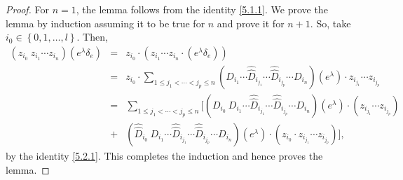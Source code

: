 \documentclass{article}
\begin{document}
\begin{proof}
For $n=1$, the lemma follows from the identity \eqref{5.1.1}. We prove the lemma by induction assuming it to be true for $n$ and prove  it for $n+1$. So, take $i_0\in \left\{0,1,\ldots, l\right\}$. Then, 
\begin{eqnarray*}
\left(z_{i_0}~z_{i_1}\cdots z_{i_n}\right) \left(e^\lambda\delta_e\right)&=&z_{i_0}\cdot \left(z_{i_1}\cdots z_{i_n}\cdot \left(e^\lambda\delta_e\right)\right)\\
&=& z_{i_0} \cdot \sum_{1\leq j_1 <\cdots< j_p\leq n}  \left( D_{i_1} \cdots \hat{\hat{D}}_{i_{j_1}}\cdots \hat{\hat{D}}_{i_{j_p}} \cdots{{D}}_{i_{n}}\right) \left(e^\lambda\right)\cdot z_{i_{j_1}}\cdots z_{i_{j_p}}\\
&=&\sum_{1\leq j_1<\cdots < j_p \leq n} [ \left( D_{i_0}~D_{i_1} \cdots \hat{\hat{D}}_{i_{j_1}}\cdots \hat{\hat{D}}_{i_{j_p}} \cdots{{D}}_{i_{n}}\right)\left(e^\lambda\right)\cdot 
 \left(z_{i_{j_1}}\cdots z_{i_{j_p}}\right) \\
 &+&\left(\hat{\hat{D}}_{i_0}~D_{i_1} \cdots \hat{\hat{D}}_{i_{j_1}}\cdots \hat{\hat{D}}_{i_{j_p}} \cdots{{D}}_{i_{n}}\right)\left(e^\lambda\right) \cdot
 \left(z_{i_0}\cdot z_{i_{j_1}}\cdots z_{i_{j_p}}\right) ],
\end{eqnarray*}
by the identity \eqref{5.2.1}. This completes the induction and hence proves the lemma. 
\end{proof}
\end{document}
